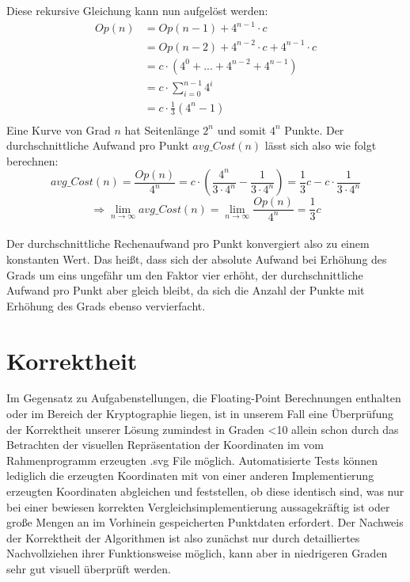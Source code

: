 \documentclass[course=erap]{aspdoc}
\begin{document}
Diese rekursive Gleichung kann nun aufgelöst werden:  \ \\ 
\begin{align*}
  Op(n) &= Op(n-1) + 4^{n-1}\cdot c\\
    &= Op(n-2) + 4^{n-2}\cdot c + 4^{n-1}\cdot c \\
    &= c\cdot(4^{0} + ... + 4^{n-2} + 4^{n-1}) \\
    &= c\cdot\sum_{i=0}^{n-1} 4^{i}\\
    &= c\cdot\frac{1}{3}(4^n-1)\\
\end{align*}
Eine Kurve von Grad $n$ hat Seitenlänge $2^n$ und somit $4^n$ Punkte. Der durchschnittliche Aufwand pro Punkt $avg\_Cost(n)$ lässt sich also wie folgt berechnen: \ \\
\[avg\_Cost(n) = \frac{Op(n)}{4^n} = c \cdot \left(\frac{4^n}{3 \cdot 4^n} - \frac{1}{3 \cdot 4^n}\right) = \frac{1}{3}c - c \cdot \frac{1}{3 \cdot 4^n}\] 
\[\Rightarrow \lim_{n\to\infty} avg\_Cost(n) = \lim_{n\to\infty} \frac{Op(n)}{4^n} = \frac{1}{3}c\]  \ \\ 
Der durchschnittliche Rechenaufwand pro Punkt konvergiert also zu einem konstanten Wert. Das heißt, dass sich der absolute Aufwand bei Erhöhung des Grads um eins ungefähr um den Faktor vier erhöht, der durchschnittliche Aufwand pro Punkt aber gleich bleibt, da sich die Anzahl der Punkte mit Erhöhung des Grads ebenso vervierfacht.

\section{Korrektheit}
Im Gegensatz zu Aufgabenstellungen, die Floating-Point Berechnungen enthalten oder im Bereich der Kryptographie liegen, ist in unserem Fall eine Überprüfung der Korrektheit unserer Lösung zumindest in Graden <10 allein schon durch das Betrachten der visuellen Repräsentation der Koordinaten im vom Rahmenprogramm erzeugten .svg File möglich. Automatisierte Tests können lediglich die erzeugten Koordinaten mit von einer anderen Implementierung erzeugten Koordinaten abgleichen und feststellen, ob diese identisch sind, was nur bei einer bewiesen korrekten Vergleichsimplementierung aussagekräftig ist oder große Mengen an im Vorhinein gespeicherten Punktdaten erfordert.
Der Nachweis der Korrektheit der Algorithmen ist also zunächst nur durch detailliertes Nachvollziehen ihrer Funktionsweise möglich, kann aber in niedrigeren Graden sehr gut visuell überprüft werden.
\end{document}
